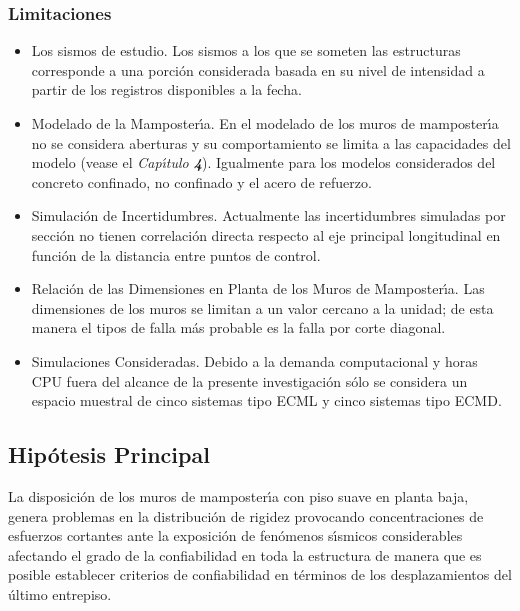 	\subsubsection{Limitaciones}
	
	\begin{itemize}
		\item Los sismos de estudio. Los sismos a los que se someten las estructuras corresponde a una porci\'on considerada basada en su nivel de intensidad a partir de los registros disponibles a la fecha.
		\item Modelado de la Mamposter\'{\i}a. En el modelado de los muros de mamposter\'{\i}a no se considera aberturas y su comportamiento se limita a las capacidades del modelo (vease el \emph{Cap\'{\i}tulo \textbf{4}}). Igualmente para los modelos considerados del concreto confinado, no confinado y el acero de refuerzo.
		\item Simulaci\'on de Incertidumbres. Actualmente las incertidumbres simuladas por secci\'on no tienen correlaci\'on directa respecto al eje principal longitudinal en funci\'on de la distancia entre puntos de control.
		\item Relaci\'on de las Dimensiones en Planta de los Muros de Mamposter\'{\i}a. Las dimensiones de los muros se limitan a un valor cercano a la unidad; de esta manera el tipos de falla m\'as probable es la falla por corte diagonal.
				\item Simulaciones Consideradas. Debido a la demanda computacional y horas CPU fuera del alcance de la presente investigaci\'on s\'olo se considera un espacio muestral de cinco sistemas tipo ECML y cinco sistemas tipo ECMD.
	\end{itemize}

\subsection{Hip\'otesis Principal}

La disposici\'on de los muros de mamposter\'{\i}a con piso suave en planta baja, genera problemas en la distribuci\'on de rigidez provocando concentraciones de esfuerzos cortantes ante la exposici\'on de fen\'omenos s\'{\i}smicos considerables afectando el grado de la confiabilidad en toda la estructura de manera que es posible establecer criterios de confiabilidad en t\'erminos de los desplazamientos del \'ultimo entrepiso.
	

